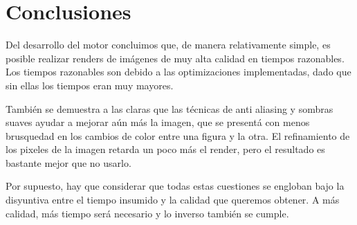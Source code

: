 
\section{Conclusiones}
\label{conc}

Del desarrollo del motor concluimos que, de manera relativamente simple, es
posible realizar renders de im\'agenes de muy alta calidad en tiempos
razonables.  Los tiempos razonables son debido a las optimizaciones
implementadas, dado que sin ellas los tiempos eran muy mayores.

Tambi\'en se demuestra a las claras que las t\'ecnicas de anti aliasing y
sombras suaves ayudar a mejorar a\'un m\'as la imagen, que se present\'a con
menos brusquedad en los cambios de color entre una figura y la otra.  El
refinamiento de los pixeles de la imagen retarda un poco m\'as el render, pero
el resultado es bastante mejor que no usarlo.

Por supuesto, hay que considerar que todas estas cuestiones se engloban bajo la
disyuntiva entre el tiempo insumido y la calidad que queremos obtener.  A m\'as
calidad, m\'as tiempo ser\'a necesario y lo inverso tambi\'en se cumple.

